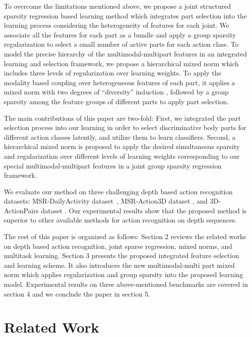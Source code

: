 \documentclass[9pt,technote,compsoc]{IEEEtran}
\begin{document}
To overcome the limitations mentioned above, we propose a joint structured sparsity regression based learning method which integrates part selection into the learning process considering the heterogeneity of features for each joint. We associate all the features for each part as a bundle and apply a group sparsity regularization to select a small number of active parts for each action class. To model the precise hierarchy of the multimodal-multipart features in an integrated learning and selection framework, we propose a hierarchical mixed norm which includes three levels of regularization over learning weights. To apply the modality based coupling over heterogeneous features of each part, it applies a mixed norm with two degrees of ``diversity'' induction \cite{738251}, followed by a group sparsity among the feature groups of different parts to apply part selection.

The main contributions of this paper are two\--fold: First, we integrated the part selection process into our learning in order to select discriminative body parts for different action classes latently, and utilize them to learn classifiers. Second, a hierarchical mixed norm is proposed to apply the desired simultaneous sparsity and regularization over different levels of learning weights corresponding to our special multimodal-multipart features in a joint group sparsity regression framework.

We evaluate our method on three challenging depth based action recognition datasets: MSR\--DailyActivity dataset~\cite{actionletPAMI}, MSR\--Action3D dataset \cite{msraction3ddataset}, and 3D\--ActionPairs dataset \cite{HON4D}. Our experimental results show that the proposed method is superior to other available methods for action recognition on depth sequences.

The rest of this paper is organized as follows: Section 2  reviews the related works on depth based action recognition, joint sparse regression, mixed norms, and multitask learning. Section 3 presents the proposed integrated feature selection and learning scheme. It also introduces the new multimodal-multi part mixed norm which applies regularization and group sparsity into the proposed learning model. Experimental results on three above-mentioned benchmarks are covered in section 4 and we conclude the paper in section 5.

\section{Related Work}
\end{document}
